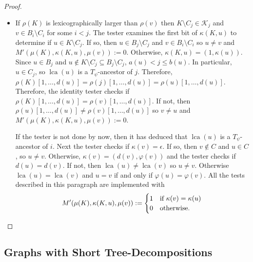 \documentclass{patmorin}
\renewcommand{\le}{\leqslant}
\DeclareMathOperator{\lca}{lca}
\begin{document}
\begin{proof}
\begin{itemize}
       \item If $\rho(K)$ is lexicographically larger than $\rho(v)$ then $K\setminus C_j\in\mathcal{K}_j$ and $v\in B_i\setminus C_i$ for some $i < j$.  The tester examines the first bit of $\kappa(K,u)$ to determine if $u\in K\setminus C_j$.  If so, then $u\in B_j\setminus C_j$ and $v\in B_i\setminus C_i$ so $u\neq v$ and $M'(\mu(K),\kappa(K,u),\mu(v)):=0$.  Otherwise, $\kappa(K,u)=(1,\kappa(u))$.  Since $u\in B_j$ and $u\not\in K\setminus C_j\subseteq B_j\setminus C_j$, $a(u) < j \le b(u)$.  In particular, $u\in C_j$, so $\lca(u)$ is a $T_\psi$-ancestor of $j$.   Therefore, $\rho(K)[1,\ldots,d(u)]=\rho(j)[1,\ldots,d(u)]=\rho(u)[1,\ldots,d(u)]$.  Therefore, the identity tester checks if $\rho(K)[1,\ldots,d(u)]=\rho(v)[1,\ldots,d(u)]$.  If not, then $\rho(u)[1,\ldots,d(u)]\neq\rho(v)[1,\ldots,d(u)]$ so $v\neq u$ and $M'(\mu(K),\kappa(K,u),\mu(v)):=0$.

       If the tester is not done by now, then it has deduced that $\lca(u)$ is a $T_\psi$-ancestor of $i$.  Next the tester checks if $\kappa(v)=\epsilon$. If so, then $v\not\in C$ and $u\in C$, so $u\neq v$.  Otherwise, $\kappa(v)=(d(v),\varphi(v))$ and the tester checks if $d(u)=d(v)$.  If not, then $\lca(u)\neq\lca(v)$ so $u\neq v$.  Otherwise $\lca(u)=\lca(v)$ and $u=v$ if and only if $\varphi(u)=\varphi(v)$. All the tests described in this paragraph are implemented with
       \[
          M'(\mu(K),\kappa(K,u),\mu(v)):=
          \begin{cases}
              1 & \text{if $\kappa(v)=\kappa(u)$} \\
              0 & \text{otherwise.}
          \end{cases} \qedhere
       \]
     \end{itemize}
  \end{proof}




\subsection{Graphs with Short Tree-Decompositions}
\end{document}
